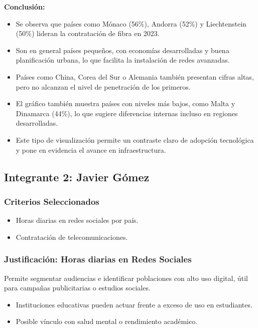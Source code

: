 \documentclass[12pt, a4paper]{article}
\begin{document}
\textbf{Conclusión:}
\begin{itemize}
    \item Se observa que países como Mónaco (56\%), Andorra (52\%) y Liechtenstein (50\%) lideran la contratación de fibra en 2023.
    \item Son en general países pequeños, con economías desarrolladas y buena planificación urbana, lo que facilita la instalación de redes avanzadas.
    \item Países como China, Corea del Sur o Alemania también presentan cifras altas, pero no alcanzan el nivel de penetración de los primeros.
    \item El gráfico también muestra países con niveles más bajos, como Malta y Dinamarca (44\%), lo que sugiere diferencias internas incluso en regiones desarrolladas.
    \item Este tipo de visualización permite un contraste claro de adopción tecnológica y pone en evidencia el avance en infraestructura.
\end{itemize}


\newpage
\subsection*{Integrante 2: Javier Gómez}

\subsubsection*{Criterios Seleccionados}
\begin{itemize}
    \item Horas diarias en redes sociales por país.
    \item Contratación de telecomunicaciones.
\end{itemize}

\subsubsection*{Justificación: Horas diarias en Redes Sociales}
Permite segmentar audiencias e identificar poblaciones con alto uso digital, útil para campañas publicitarias o estudios sociales.

\begin{itemize}
    \item Instituciones educativas pueden actuar frente a exceso de uso en estudiantes.
    \item Posible vínculo con salud mental o rendimiento académico.
\end{itemize}
\end{document}
